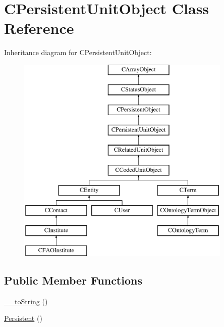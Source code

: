 \hypertarget{class_c_persistent_unit_object}{\section{C\-Persistent\-Unit\-Object Class Reference}
\label{class_c_persistent_unit_object}
}
Inheritance diagram for C\-Persistent\-Unit\-Object\-:\begin{figure}[H]
\begin{center}
\leavevmode
\includegraphics[height=10.000000cm]{class_c_persistent_unit_object}
\end{center}
\end{figure}
\subsection*{Public Member Functions}
\begin{DoxyCompactItemize}
\item 
\hyperlink{class_c_persistent_unit_object_af75b0a5542f5d14a9a2879e5d3864cac}{\-\_\-\-\_\-to\-String} ()
\item 
\hyperlink{class_c_persistent_unit_object_a953695de3bbfc5c3d76d0b9b3a39f6a1}{Persistent} ()
\end{DoxyCompactItemize}
